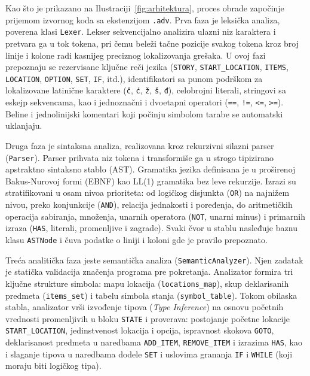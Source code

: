 \documentclass[12pt,a4paper]{article}
\begin{document}
Kao što je prikazano na Ilustraciji~\ref{fig:arhitektura}, proces obrade započinje prijemom izvornog koda sa ekstenzijom \texttt{.adv}. Prva faza je leksička analiza, poverena klasi \texttt{Lexer}. Lekser sekvencijalno analizira ulazni niz karaktera i pretvara ga u tok tokena, pri čemu beleži tačne pozicije svakog tokena kroz broj linije i kolone radi kasnijeg preciznog lokalizovanja grešaka. U ovoj fazi prepoznaju se rezervisane ključne reči jezika (\texttt{STORY}, \texttt{START\_LOCATION}, \texttt{ITEMS}, \texttt{LOCATION}, \texttt{OPTION}, \texttt{SET}, \texttt{IF}, itd.), identifikatori sa punom podrškom za lokalizovane latinične karaktere (\texttt{č}, \texttt{ć}, \texttt{ž}, \texttt{š}, \texttt{đ}), celobrojni literali, stringovi sa eskejp sekvencama, kao i jednoznačni i dvoetapni operatori (\texttt{==}, \texttt{!=}, \texttt{<=}, \texttt{>=}). Beline i jednolinijski komentari koji počinju simbolom tarabe se automatski uklanjaju.

Druga faza je sintaksna analiza, realizovana kroz rekurzivni silazni parser (\texttt{Parser}). Parser prihvata niz tokena i transformiše ga u strogo tipizirano apstraktno sintaksno stablo (AST). Gramatika jezika definisana je u proširenoj Bakus-Nurovoj formi (EBNF) kao LL(1) gramatika bez leve rekurzije. Izrazi su stratifikovani u osam nivoa prioriteta: od logičkog disjunkta (\texttt{OR}) na najnižem nivou, preko konjunkcije (\texttt{AND}), relacija jednakosti i poređenja, do aritmetičkih operacija sabiranja, množenja, unarnih operatora (\texttt{NOT}, unarni minus) i primarnih izraza (\texttt{HAS}, literali, promenljive i zagrade). Svaki čvor u stablu nasleđuje baznu klasu \texttt{ASTNode} i čuva podatke o liniji i koloni gde je pravilo prepoznato.

Treća analitička faza jeste semantička analiza (\texttt{SemanticAnalyzer}). Njen zadatak je statička validacija značenja programa pre pokretanja. Analizator formira tri ključne strukture simbola: mapu lokacija (\texttt{locations\_map}), skup deklarisanih predmeta (\texttt{items\_set}) i tabelu simbola stanja (\texttt{symbol\_table}). Tokom obilaska stabla, analizator vrši izvođenje tipova (\emph{Type Inference}) na osnovu početnih vrednosti promenljivih u bloku \texttt{STATE} i proverava: postojanje početne lokacije \texttt{START\_LOCATION}, jedinstvenost lokacija i opcija, ispravnost skokova \texttt{GOTO}, deklarisanost predmeta u naredbama \texttt{ADD\_ITEM}, \texttt{REMOVE\_ITEM} i izrazima \texttt{HAS}, kao i slaganje tipova u naredbama dodele \texttt{SET} i uslovima grananja \texttt{IF} i \texttt{WHILE} (koji moraju biti logičkog tipa).
\end{document}
